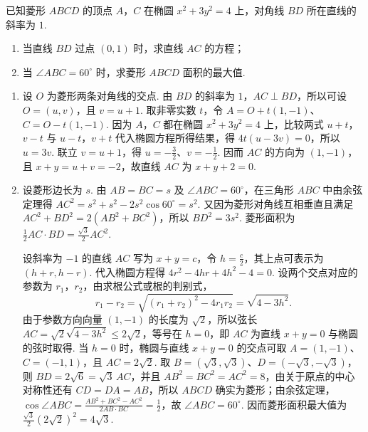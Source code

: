 \begin{problem}
已知菱形 \(ABCD\) 的顶点 \(A\)，\(C\) 在椭圆 \(x^{2} + 3y^{2} = 4\) 上，对角线 \(BD\) 所在直线的斜率为 \(1\).

\begin{enumerate}
\item 当直线 \(BD\) 过点 \((0,1)\) 时，求直线 \(AC\) 的方程；
\item 当 \(\angle ABC = 60^{\circ}\) 时，求菱形 \(ABCD\) 面积的最大值.
\end{enumerate}

\begin{solution}
\begin{enumerate}
\item 设 \(O\) 为菱形两条对角线的交点. 由 \(BD\) 的斜率为 \(1\)，\(AC\perp BD\)，所以可设 \(O=(u,v)\)，且 \(v=u+1\). 取非零实数 \(t\)，令 \(A=O+t(1,-1)\)、\(C=O-t(1,-1)\). 因为 \(A\)，\(C\) 都在椭圆 \(x^2+3y^2=4\) 上，比较两式 \(u+t\)，\(v-t\) 与 \(u-t\)，\(v+t\) 代入椭圆方程所得结果，得 \(4t(u-3v)=0\)，所以 \(u=3v\). 联立 \(v=u+1\)，得 \(u=-\frac32\)、\(v=-\frac12\). 因而 \(AC\) 的方向为 \((1,-1)\)，且 \(x+y=u+v=-2\)，故直线 \(AC\) 为 \(x+y+2=0\).
\item 设菱形边长为 \(s\). 由 \(AB=BC=s\) 及 \(\angle ABC=60^{\circ}\)，在三角形 \(ABC\) 中由余弦定理得 \(AC^2=s^2+s^2-2s^2\cos60^{\circ}=s^2\). 又因为菱形对角线互相垂直且满足 \(AC^2+BD^2=2(AB^2+BC^2)\)，所以 \(BD^2=3s^2\). 菱形面积为 \(\frac12AC\cdot BD=\frac{\sqrt3}{2}AC^2\).

设斜率为 \(-1\) 的直线 \(AC\) 写为 \(x+y=c\)，令 \(h=\frac c2\)，其上点可表示为 \((h+r,h-r)\). 代入椭圆方程得 \(4r^2-4hr+4h^2-4=0\). 设两个交点对应的参数为 \(r_1\)，\(r_2\)，由求根公式或根的判别式，\[
r_1-r_2=\sqrt{(r_1+r_2)^2-4r_1r_2}=\sqrt{4-3h^2}.
\]
由于参数方向向量 \((1,-1)\) 的长度为 \(\sqrt2\)，所以弦长
\(AC=\sqrt2\sqrt{4-3h^2}\leqslant2\sqrt2\)，等号在 \(h=0\)，即 \(AC\) 为直线 \(x+y=0\) 与椭圆的弦时取得. 当 \(h=0\) 时，椭圆与直线 \(x+y=0\) 的交点可取 \(A=(1,-1)\)、\(C=(-1,1)\)，且 \(AC=2\sqrt2\). 取 \(B=(\sqrt3,\sqrt3)\)、\(D=(-\sqrt3,-\sqrt3)\)，则 \(BD=2\sqrt6=\sqrt3\,AC\)，并且 \(AB^2=BC^2=AC^2=8\)，由关于原点的中心对称性还有 \(CD=DA=AB\)，所以 \(ABCD\) 确实为菱形；由余弦定理，\(\cos\angle ABC=\frac{AB^2+BC^2-AC^2}{2AB\cdot BC}=\frac12\)，故 \(\angle ABC=60^{\circ}\). 因而菱形面积最大值为 \(\frac{\sqrt3}{2}(2\sqrt2)^2=4\sqrt3\).
\end{enumerate}
\end{solution}
\end{problem}

